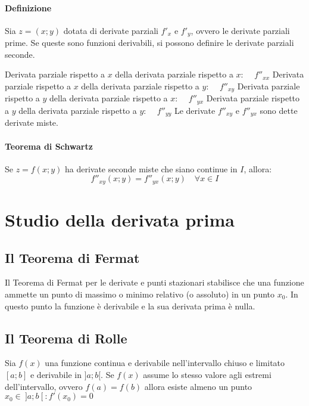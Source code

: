 \documentclass[a4paper,14pt]{extarticle}
\begin{document}
\paragraph{ Definizione \\} Sia $z=(x;y)$ dotata di derivate parziali $f'_x$ e $f'_y$, ovvero le derivate parziali prime. Se queste sono funzioni derivabili, si possono definire le derivate parziali seconde.
\newline \par \noindent Derivata parziale rispetto a $x$ della derivata parziale rispetto a $x$: \large $\quad f''_{xx}$ \normalsize
\newline Derivata parziale rispetto a $x$ della derivata parziale rispetto a $y$: \large $\quad f''_{xy}$ \normalsize
\newline Derivata parziale rispetto a $y$ della derivata parziale rispetto a $x$: \large $\quad f''_{yx}$ \normalsize
\newline Derivata parziale rispetto a $y$ della derivata parziale rispetto a $y$: \large $\quad f''_{yy}$ \normalsize
\newline \newline Le derivate \large $f''_{xy}$ \normalsize e \large $f''_{yx}$ \normalsize sono dette derivate miste.
\paragraph{Teorema di Schwartz \\}  Se $z=f(x;y)$ ha derivate seconde miste che siano continue in $I$, allora: \large \[ f''_{xy}(x;y) = f''_{yx}(x;y) \quad \forall x \in I \]
\normalsize

\section{Studio della derivata prima}
\subsection{Il Teorema di Fermat}
Il Teorema di Fermat per le derivate e punti stazionari stabilisce che una funzione ammette un punto di massimo o minimo relativo (o assoluto) in un punto $x_0$. In questo punto la funzione è derivabile e la sua derivata prima è nulla.

\subsection{Il Teorema di Rolle}
Sia $f(x)$ una funzione continua e derivabile nell'intervallo chiuso e limitato $[a; b]$ e derivabile in $]a; b[$. Se $f(x)$ assume lo stesso valore agli estremi dell'intervallo, ovvero $f(a) = f(b)$ allora esiste almeno un punto \(x_0 \in \ ]a; b\ [ \ : f'(x_0) = 0 \)
\end{document}
